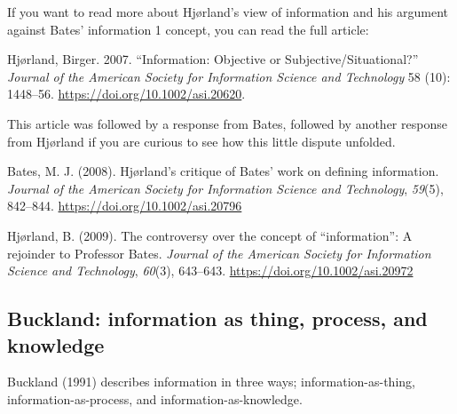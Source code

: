 \documentclass[
  letterpaper,
  DIV=11,
  numbers=noendperiod]{scrreprt}
\begin{document}
\begin{tcolorbox}[enhanced jigsaw, arc=.35mm, bottomrule=.15mm, bottomtitle=1mm, breakable, colback=white, colbacktitle=quarto-callout-note-color!10!white, colframe=quarto-callout-note-color-frame, coltitle=black, left=2mm, leftrule=.75mm, opacityback=0, opacitybacktitle=0.6, rightrule=.15mm, title=\textcolor{quarto-callout-note-color}{\faInfo}\hspace{0.5em}{Suggested readings}, titlerule=0mm, toprule=.15mm, toptitle=1mm]

If you want to read more about Hjørland's view of information and his
argument against Bates' information 1 concept, you can read the full
article:

Hjørland, Birger. 2007. ``Information: Objective or
Subjective/Situational?'' \emph{Journal of the American Society for
Information Science and Technology} 58 (10): 1448--56.
\url{https://doi.org/10.1002/asi.20620}.

This article was followed by a response from Bates, followed by another
response from Hjørland if you are curious to see how this little dispute
unfolded.

Bates, M. J. (2008). Hjørland's critique of Bates' work on defining
information. \emph{Journal of the American Society for Information
Science and Technology}, \emph{59}(5), 842--844.
\url{https://doi.org/10.1002/asi.20796}

Hjørland, B. (2009). The controversy over the concept of
``information'': A rejoinder to Professor Bates. \emph{Journal of the
American Society for Information Science and Technology}, \emph{60}(3),
643--643. \url{https://doi.org/10.1002/asi.20972}

\end{tcolorbox}

\subsection{Buckland: information as thing, process, and
knowledge}\label{buckland-information-as-thing-process-and-knowledge}

Buckland (1991) describes information in three ways;
information-as-thing, information-as-process, and
information-as-knowledge.
\end{document}
